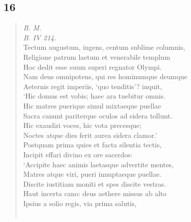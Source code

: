 \documentclass[11pt, a4paper]{report}
\begin{document}
            \subsection*{16}
      \begin{verse}
      \textit{B. M.} \\ \textit{B. IV 214.} \\ Tectum augustum, ingens, centum snblime columnis, \\ Religione patrum laetum et venerabile templum \\ Hoc dedit esse suum superi regnator Olympi. \\ Nam deus omnipotens, qui res hominumque deumque \\ Aeternis regit imperiis, ‘quo tenditis’? inquit, \\ ‘Hic domus est vobis; haec ara tuebitur omnis. \\ Hic matres puerique simul mixtaeque puellae \\ Sacra canunt pariterque oculos ad sidera tollunt. \\ Hic exaudiri voces, hic vota precesque; \\ Noctes atque dies ferit aurea sidera clamor.’ \\ Postquam prima quies et facta silentia tectis, \\ Incipit effari divino ex ore sacerdos: \\ ‘Accipite haec animis laetasque advertite mentes, \\ Matres atque viri, pueri innuptaeque puellae. \\ Discite iustitiam moniti et spes discite vestras. \\ Haut incerta cano: deus aethere missus ab alto \\ Ipsius a solio regis, via prima salutis, \\ 
        ﻿\pagebreak 

\end{verse}
\end{document}
